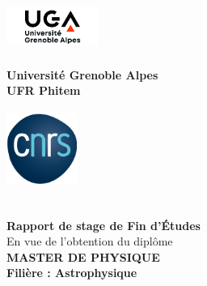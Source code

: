 \documentclass[10pt, a4paper]{report}
\numberwithin{equation}{subsection}
\begin{document}
\begin{titlepage}
\begin{center}
	\begin{minipage}{2.5cm}
	\begin{center}
		\includegraphics[width=3.0cm,height=1.7cm]{uga.png}
		
	\end{center}
\end{minipage}\hfill
\begin{minipage}{10cm}
	\begin{center}
	\textbf{ Université Grenoble Alpes}\\[0.1cm]
    \textbf{UFR Phitem}\\[0.1cm]
		
	\end{center}
\end{minipage}\hfill
\begin{minipage}{2.5cm}
	\begin{center}
		\includegraphics[width=2.3cm,height=2.5cm]{cnrs.png}
	\end{center}

\end{minipage}
\textsc{\Large }\\[1.5cm]
{\large \bfseries Rapport de stage de Fin d'\uppercase{é}tudes}\\[0.5cm]
{\large En vue de l'obtention du diplôme}\\[1cm]

{\huge \bfseries \uppercase{Master de physique} \\[0.5cm] }
{\large \bfseries Filière : Astrophysique}
\textsc{\Large }\\[1cm]


\end{center}
\end{titlepage}
\end{document}
